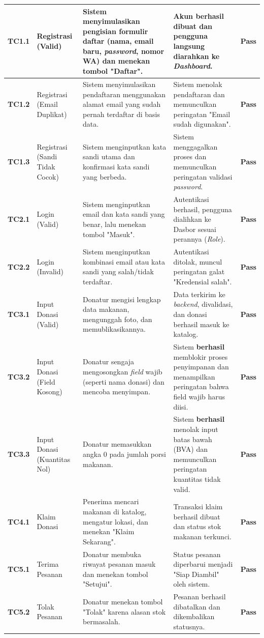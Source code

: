 \begin{longtable}{|>{\centering\arraybackslash}m{1.0cm}|p{2.3cm}|p{4.0cm}|p{4.0cm}|>{\centering\arraybackslash}m{1.2cm}|}
\textbf{TC1.1} & Registrasi (Valid) & Sistem menyimulasikan pengisian formulir daftar (nama, email baru, \textit{password}, nomor WA) dan menekan tombol "Daftar". & Akun berhasil dibuat dan pengguna langsung diarahkan ke \textit{Dashboard}. & \textbf{Pass} \\ \hline
\textbf{TC1.2} & Registrasi (Email Duplikat) & Sistem menyimulasikan pendaftaran menggunakan alamat email yang sudah pernah terdaftar di basis data. & Sistem menolak pendaftaran dan memunculkan peringatan "Email sudah digunakan". & \textbf{Pass} \\ \hline
\textbf{TC1.3} & Registrasi (Sandi Tidak Cocok) & Sistem menginputkan kata sandi utama dan konfirmasi kata sandi yang berbeda. & Sistem menggagalkan proses dan memunculkan peringatan validasi \textit{password}. & \textbf{Pass} \\ \hline
\textbf{TC2.1} & Login (Valid) & Sistem menginputkan email dan kata sandi yang benar, lalu menekan tombol "Masuk". & Autentikasi berhasil, pengguna dialihkan ke Dasbor sesuai perannya (\textit{Role}). & \textbf{Pass} \\ \hline
\textbf{TC2.2} & Login (Invalid) & Sistem menginputkan kombinasi email atau kata sandi yang salah/tidak terdaftar. & Autentikasi ditolak, muncul peringatan galat "Kredensial salah". & \textbf{Pass} \\ \hline
\textbf{TC3.1} & Input Donasi (Valid) & Donatur mengisi lengkap data makanan, mengunggah foto, dan memublikasikannya. & Data terkirim ke \textit{backend}, divalidasi, dan donasi berhasil masuk ke katalog. & \textbf{Pass} \\ \hline
\textbf{TC3.2} & Input Donasi (Field Kosong) & Donatur sengaja mengosongkan \textit{field} wajib (seperti nama donasi) dan mencoba menyimpan. & Sistem \textbf{berhasil} memblokir proses penyimpanan dan menampilkan peringatan bahwa field wajib harus diisi. & \textbf{Pass} \\ \hline
\textbf{TC3.3} & Input Donasi (Kuantitas Nol) & Donatur memasukkan angka 0 pada jumlah porsi makanan. & Sistem \textbf{berhasil} menolak input batas bawah (BVA) dan memunculkan peringatan kuantitas tidak valid. & \textbf{Pass} \\ \hline
\textbf{TC4.1} & Klaim Donasi & Penerima mencari makanan di katalog, mengatur lokasi, dan menekan "Klaim Sekarang". & Transaksi klaim berhasil dibuat dan status stok makanan terkunci. & \textbf{Pass} \\ \hline
\textbf{TC5.1} & Terima Pesanan & Donatur membuka riwayat pesanan masuk dan menekan tombol "Setujui". & Status pesanan diperbarui menjadi "Siap Diambil" oleh sistem. & \textbf{Pass} \\ \hline
\textbf{TC5.2} & Tolak Pesanan & Donatur menekan tombol "Tolak" karena alasan stok bermasalah. & Pesanan berhasil dibatalkan dan dikembalikan statusnya. & \textbf{Pass} \\ \hline
\end{longtable}

